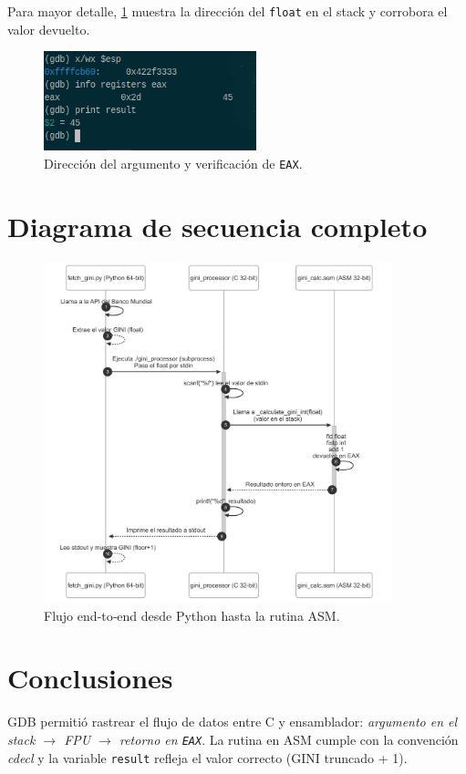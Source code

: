\documentclass[a4paper,12pt]{article}
\begin{document}
Para mayor detalle, \cref{fig:eaxstack} muestra la dirección del
\texttt{float} en el stack y corrobora el valor devuelto.

\begin{figure}[H]
  \centering
  \includegraphics[width=0.55\textwidth]{ubicacionyvaloreax.png}
  \caption{Dirección del argumento y verificación de \texttt{EAX}.}
  \label{fig:eaxstack}
\end{figure}

\section{Diagrama de secuencia completo}
\begin{figure}[H]
  \centering
  \includegraphics[width=0.9\textwidth]{diagram.png}
  \caption{Flujo end‑to‑end desde Python hasta la rutina ASM.}
  \label{fig:sequence}
\end{figure}

\section{Conclusiones}
GDB permitió rastrear el flujo de datos entre C y ensamblador:  
\textit{argumento en el stack $\rightarrow$ FPU $\rightarrow$ retorno en
\texttt{EAX}}.  La rutina en ASM cumple con la convención \emph{cdecl} y la
variable \texttt{result} refleja el valor correcto (GINI truncado + 1).
\end{document}
